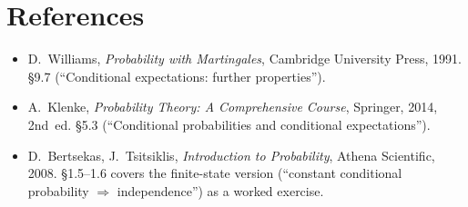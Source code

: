 \documentclass[11pt,a4paper]{article}
\theoremstyle{plain}
\theoremstyle{definition}
\theoremstyle{remark}
\begin{document}
\section{References}

\begin{itemize}[leftmargin=*]
  \item D.~Williams, \emph{Probability with Martingales}, Cambridge
    University Press, 1991. \S 9.7 (``Conditional expectations:
    further properties'').
  \item A.~Klenke, \emph{Probability Theory: A Comprehensive Course},
    Springer, 2014, 2nd~ed. \S 5.3 (``Conditional probabilities and
    conditional expectations'').
  \item D.~Bertsekas, J.~Tsitsiklis, \emph{Introduction to
    Probability}, Athena Scientific, 2008. \S 1.5--1.6 covers the
    finite-state version (``constant conditional probability $\Rightarrow$
    independence'') as a worked exercise.
\end{itemize}
\end{document}
